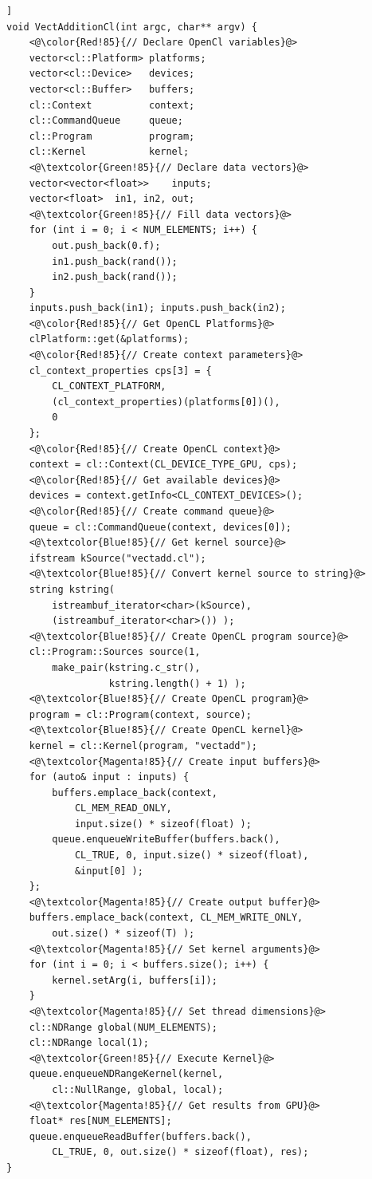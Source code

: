 \documentclass{sig-alternate-05-2015}
\begin{document}
\begin{lstlisting}[caption=Vector addition on the device using
OpenCL highlighting the different cross-cutting components.,label=vectcl,float=[t!]]
void VectAdditionCl(int argc, char** argv) {
	<@\color{Red!85}{// Declare OpenCl variables}@>
	vector<cl::Platform> platforms;
	vector<cl::Device>   devices;
	vector<cl::Buffer>   buffers;
	cl::Context          context;
	cl::CommandQueue     queue;
	cl::Program          program;
	cl::Kernel           kernel;
	<@\textcolor{Green!85}{// Declare data vectors}@>
	vector<vector<float>>    inputs;
	vector<float>  in1, in2, out;
	<@\textcolor{Green!85}{// Fill data vectors}@>
	for (int i = 0; i < NUM_ELEMENTS; i++) {
		out.push_back(0.f);
		in1.push_back(rand());
		in2.push_back(rand());
	}
	inputs.push_back(in1); inputs.push_back(in2);
	<@\color{Red!85}{// Get OpenCL Platforms}@>
	clPlatform::get(&platforms);
	<@\color{Red!85}{// Create context parameters}@>
	cl_context_properties cps[3] = {
		CL_CONTEXT_PLATFORM,
		(cl_context_properties)(platforms[0])(),
		0 
	};
	<@\color{Red!85}{// Create OpenCL context}@>
	context = cl::Context(CL_DEVICE_TYPE_GPU, cps);
	<@\color{Red!85}{// Get available devices}@>
	devices = context.getInfo<CL_CONTEXT_DEVICES>();
	<@\color{Red!85}{// Create command queue}@>
	queue = cl::CommandQueue(context, devices[0]);
	<@\textcolor{Blue!85}{// Get kernel source}@>
	ifstream kSource("vectadd.cl");
	<@\textcolor{Blue!85}{// Convert kernel source to string}@>
	string kstring(
		istreambuf_iterator<char>(kSource),
		(istreambuf_iterator<char>()) );
	<@\textcolor{Blue!85}{// Create OpenCL program source}@>
	cl::Program::Sources source(1, 
		make_pair(kstring.c_str(), 
		          kstring.length() + 1) );
	<@\textcolor{Blue!85}{// Create OpenCL program}@>
	program = cl::Program(context, source);
	<@\textcolor{Blue!85}{// Create OpenCL kernel}@>
	kernel = cl::Kernel(program, "vectadd");
	<@\textcolor{Magenta!85}{// Create input buffers}@>
	for (auto& input : inputs) {
		buffers.emplace_back(context, 
			CL_MEM_READ_ONLY, 
			input.size() * sizeof(float) );
		queue.enqueueWriteBuffer(buffers.back(),
			CL_TRUE, 0, input.size() * sizeof(float),
            &input[0] );
	};
	<@\textcolor{Magenta!85}{// Create output buffer}@>
	buffers.emplace_back(context, CL_MEM_WRITE_ONLY,
		out.size() * sizeof(T) );
	<@\textcolor{Magenta!85}{// Set kernel arguments}@>
	for (int i = 0; i < buffers.size(); i++) {
		kernel.setArg(i, buffers[i]);
	}
	<@\textcolor{Magenta!85}{// Set thread dimensions}@>
	cl::NDRange global(NUM_ELEMENTS);
	cl::NDRange local(1);
	<@\textcolor{Green!85}{// Execute Kernel}@>
	queue.enqueueNDRangeKernel(kernel,
		cl::NullRange, global, local);
	<@\textcolor{Magenta!85}{// Get results from GPU}@>
	float* res[NUM_ELEMENTS];
	queue.enqueueReadBuffer(buffers.back(),
		CL_TRUE, 0, out.size() * sizeof(float), res);
}
\end{lstlisting}
\end{document}

